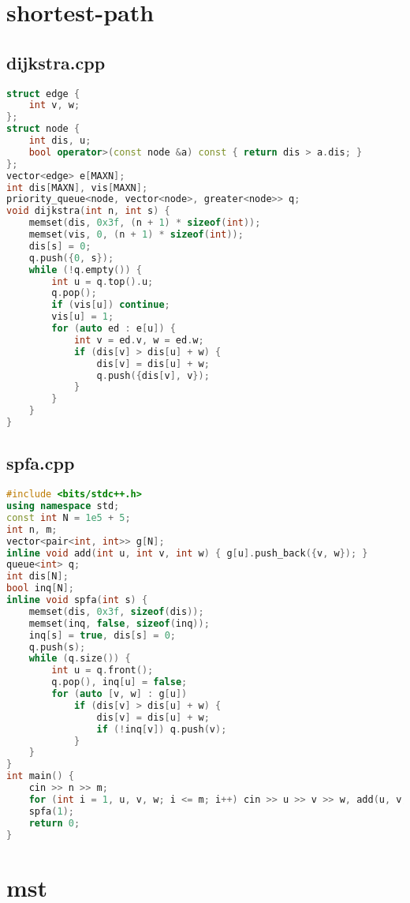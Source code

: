 \documentclass[9pt, a4paper, oneside]{book}
\begin{document}
\section{shortest-path}
\subsection{dijkstra.cpp}
\begin{lstlisting}[language={C++}]
struct edge {
    int v, w;
};
struct node {
    int dis, u;
    bool operator>(const node &a) const { return dis > a.dis; }
};
vector<edge> e[MAXN];
int dis[MAXN], vis[MAXN];
priority_queue<node, vector<node>, greater<node>> q;
void dijkstra(int n, int s) {
    memset(dis, 0x3f, (n + 1) * sizeof(int));
    memset(vis, 0, (n + 1) * sizeof(int));
    dis[s] = 0;
    q.push({0, s});
    while (!q.empty()) {
        int u = q.top().u;
        q.pop();
        if (vis[u]) continue;
        vis[u] = 1;
        for (auto ed : e[u]) {
            int v = ed.v, w = ed.w;
            if (dis[v] > dis[u] + w) {
                dis[v] = dis[u] + w;
                q.push({dis[v], v});
            }
        }
    }
}\end{lstlisting}
\subsection{spfa.cpp}
\begin{lstlisting}[language={C++}]
#include <bits/stdc++.h>
using namespace std;
const int N = 1e5 + 5;
int n, m;
vector<pair<int, int>> g[N];
inline void add(int u, int v, int w) { g[u].push_back({v, w}); }
queue<int> q;
int dis[N];
bool inq[N];
inline void spfa(int s) {
    memset(dis, 0x3f, sizeof(dis));
    memset(inq, false, sizeof(inq));
    inq[s] = true, dis[s] = 0;
    q.push(s);
    while (q.size()) {
        int u = q.front();
        q.pop(), inq[u] = false;
        for (auto [v, w] : g[u])
            if (dis[v] > dis[u] + w) {
                dis[v] = dis[u] + w;
                if (!inq[v]) q.push(v);
            }
    }
}
int main() {
    cin >> n >> m;
    for (int i = 1, u, v, w; i <= m; i++) cin >> u >> v >> w, add(u, v, w), add(v, u, w);
    spfa(1);
    return 0;
}\end{lstlisting}
\section{mst}
\end{document}

